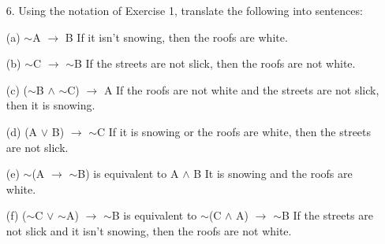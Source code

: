 \documentclass{article}
\begin{document}
\begin{itemize}
    (b) If Lincoln was the first United States president, then $2 + 2 = 5$.\\
    Converse: {\color{blue} If $2 + 2 = 5$, the Lincoln was the first United States president.}\\
    Inverse: {\color{olive} If Lincoln wasn't the first United states president, then $2 + 2 \neq 5$.}\\
    Contrapositive: {\color{purple} If $2 + 2 \neq 5$, the Lincoln wasn't the first United States president.}
    
    (c) If Mexico is the southern neighbor of the United States, then $3 + 3 = 6$.\\
    Converse: {\color{blue} If $3 + 3 = 6$, then Mexico is the southern neighbor of the United States.}\\
    Inverse: {\color{olive} If Mexico isn't the southern neighbor of the United States, then $3 + 3 \neq 6$.}\\
    Contrapositive: {\color{purple} If $3 + 3 \neq 6$, then Mexico isn't the southern neighbor of the United States.}
    
    (d) If Canada is in Asia, then $3 + 3 = 6$.\\
    Converse: {\color{blue} If $3 + 3 = 6$, the Canada is in Asia.}\\
    Inverse: {\color{olive} If Canada isn't in Asia, then $3 + 3 \neq 6$.}\\
    Contrapositive: {\color{purple} If $3 + 3 \neq 6$, then Canada isn't in Asia.}
    
    \item[6.] Using the notation of Exercise 1, translate the following into sentences:
    
    (a) $\sim$A $\to$ B {\color{blue} If it isn't snowing, then the roofs are white.}
    
    (b) $\sim$C $\to$ $\sim$B {\color{blue} If the streets are not slick, then the roofs are not white.}
    
    (c) ($\sim$B $\wedge$ $\sim$C) $\to$ A {\color{blue} If the roofs are not white and the streets are not slick, then it is snowing.}
    
    (d) (A $\vee$ B) $\to$ $\sim$C {\color{blue} If it is snowing or the roofs are white, then the streets are not slick.}
    
    (e) $\sim$(A $\to$ $\sim$B) is equivalent to A $\wedge$ B {\color{blue} It is snowing and the roofs are white.}
    
    (f)  ($\sim$C $\vee$ $\sim$A) $\to$ $\sim$B is equivalent to $\sim$(C $\wedge$ A) $\to$ $\sim$B {\color{blue} If the streets are not slick and it isn't snowing, then the roofs are not white.}
    

\end{itemize}
\end{document}
